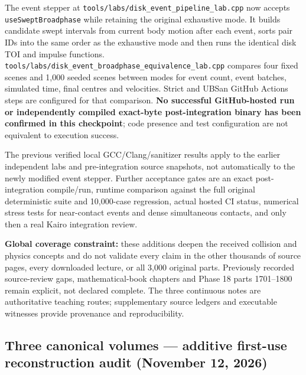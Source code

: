The event stepper at \texttt{tools/labs/disk\_event\_pipeline\_lab.cpp} now accepts \texttt{useSweptBroadphase} while retaining the original exhaustive mode. It builds candidate swept intervals from current body motion after each event, sorts pair IDs into the same order as the exhaustive mode and then runs the identical disk TOI and impulse functions. \texttt{tools/labs/disk\_event\_broadphase\_equivalence\_lab.cpp} compares four fixed scenes and 1,000 seeded scenes between modes for event count, event batches, simulated time, final centres and velocities. Strict and UBSan GitHub Actions steps are configured for that comparison. \textbf{No successful GitHub-hosted run or independently compiled exact-byte post-integration binary has been confirmed in this checkpoint}; code presence and test configuration are not equivalent to execution success.

The previous verified local GCC/Clang/sanitizer results apply to the earlier independent labs and pre-integration source snapshots, not automatically to the newly modified event stepper. Further acceptance gates are an exact post-integration compile/run, runtime comparison against the full original deterministic suite and 10,000-case regression, actual hosted CI status, numerical stress tests for near-contact events and dense simultaneous contacts, and only then a real Kairo integration review.

\textbf{Global coverage constraint:} these additions deepen the received collision and physics concepts and do not validate every claim in the other thousands of source pages, every downloaded lecture, or all 3,000 original parts. Previously recorded source-review gaps, mathematical-book chapters and Phase 18 parts 1701--1800 remain explicit, not declared complete. The three continuous notes are authoritative teaching routes; supplementary source ledgers and executable witnesses provide provenance and reproducibility.

\subsection{Three canonical volumes --- additive first-use reconstruction audit (November 12, 2026)}\label{appendix-3b67654799a2-three-canonical-volumes-additive-first-use-reconstruction-audit-november-12-2026}

